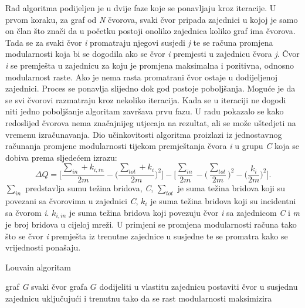 Rad algoritma podijeljen je u dvije faze koje se ponavljaju kroz iteracije. U prvom koraku, za graf od \textit{N} čvorova, svaki čvor pripada zajednici u kojoj je samo on član što znači da u početku postoji onoliko zajednica koliko graf ima čvorova. Tada se za svaki čvor \textit{i} promatraju njegovi susjedi \textit{j} te se računa promjena modularnosti koja bi se dogodila ako se čvor \textit{i} premjesti u zajednicu čvora \textit{j}. Čvor \textit{i} se premješta u zajednicu za koju je promjena maksimalna i pozitivna, odnosno modularnost raste. Ako je nema rasta promatrani čvor ostaje u dodijeljenoj zajednici. Proces se ponavlja slijedno dok god postoje poboljšanja. Moguće je da se svi čvorovi razmatraju kroz nekoliko iteracija. Kada se u iteraciji ne dogodi niti jedno poboljšanje algoritam završava prvu fazu. U radu \cite{blondel2008fast} pokazalo se kako redoslijed čvorova nema značajnijeg utjecaja na rezultat, ali se može uštedjeti na vremenu izračunavanja. Dio učinkovitosti algoritma proizlazi iz jednostavnog računanja promjene modularnosti tijekom premještanja čvora \textit{i} u grupu \textit{C} koja se dobiva prema sljedećem izrazu: 
\begin{equation}
	\Delta Q =  \bigg[ \frac{\sum_{in} + k_{i,in}}{2m} - \bigg( \dfrac{\sum_{tot} + k_{i} }{2m} \bigg)^{2} \bigg] 
	- 
	\bigg[ \dfrac{\sum_{in}}{2m} - \big( \dfrac{\sum_{tot}}{2m} \big)^{2} - \bigg( \dfrac{k_{i}}{2m} \bigg)^{2} \bigg] .
\end{equation}
\bigskip
$\sum_{in}$ predstavlja sumu težina bridova, \textit{C}, $\sum_{tot}$ je suma težina bridova koji su povezani sa čvorovima u zajednici \textit{C}, $k_{i}$ je suma težina bridova koji su incidentni sa čvorom \textit{i}. $k_{i,in}$ je suma težina bridova koji povezuju čvor \textit{i} sa zajednicom \textit{C} i \textit{m} je broj bridova u cijeloj mreži. U primjeni se promjena modularnosti računa tako što se čvor \textit{i} premješta iz trenutne zajednice u susjedne te se promatra kako se vrijednosti ponašaju.

\bigskip
\begin{algorithm}
	\caption{Louvain algoritam}
	\begin{algorithmic}[1]
		\REQUIRE graf \textit{G}
		\REPEAT 
		\STATE svaki čvor grafa $G$ dodijeliti u vlastitu zajednicu
		\STATE postaviti čvor u susjednu zajednicu uključujući i trenutnu tako da se rast modularnosti maksimizira
		\ENDFOR
		\ENDWHILE
		\ELSE {} 
		\ENDIF
		\UNTIL{}
	\end{algorithmic}
\end{algorithm}
\bigskip

